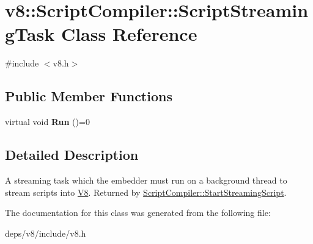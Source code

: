 \hypertarget{classv8_1_1_script_compiler_1_1_script_streaming_task}{}\section{v8\+:\+:Script\+Compiler\+:\+:Script\+Streaming\+Task Class Reference}
\label{classv8_1_1_script_compiler_1_1_script_streaming_task}


{\ttfamily \#include $<$v8.\+h$>$}

\subsection*{Public Member Functions}
\begin{DoxyCompactItemize}
\item 
\hypertarget{classv8_1_1_script_compiler_1_1_script_streaming_task_a8eb7a750cbd26ee62c70067c0408c3e1}{}virtual void {\bfseries Run} ()=0\label{classv8_1_1_script_compiler_1_1_script_streaming_task_a8eb7a750cbd26ee62c70067c0408c3e1}

\end{DoxyCompactItemize}


\subsection{Detailed Description}
A streaming task which the embedder must run on a background thread to stream scripts into \hyperlink{classv8_1_1_v8}{V8}. Returned by \hyperlink{classv8_1_1_script_compiler_a406bb44ef02d644d94bccd3f7b04f2d4}{Script\+Compiler\+::\+Start\+Streaming\+Script}. 

The documentation for this class was generated from the following file\+:\begin{DoxyCompactItemize}
\item 
deps/v8/include/v8.\+h\end{DoxyCompactItemize}
